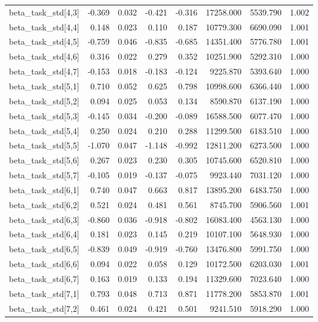 \begin{tabular}{lrrrrrrr}
beta\_task\_std[4,3] & -0.369 & 0.032 & -0.421 & -0.316 & 17258.000 & 5539.790 & 1.002 \\
beta\_task\_std[4,4] & 0.148 & 0.023 & 0.110 & 0.187 & 10779.300 & 6690.090 & 1.001 \\
beta\_task\_std[4,5] & -0.759 & 0.046 & -0.835 & -0.685 & 14351.400 & 5776.780 & 1.001 \\
beta\_task\_std[4,6] & 0.316 & 0.022 & 0.279 & 0.352 & 10251.900 & 5292.310 & 1.000 \\
beta\_task\_std[4,7] & -0.153 & 0.018 & -0.183 & -0.124 & 9225.870 & 5393.640 & 1.000 \\
beta\_task\_std[5,1] & 0.710 & 0.052 & 0.625 & 0.798 & 10998.600 & 6366.440 & 1.000 \\
beta\_task\_std[5,2] & 0.094 & 0.025 & 0.053 & 0.134 & 8590.870 & 6137.190 & 1.000 \\
beta\_task\_std[5,3] & -0.145 & 0.034 & -0.200 & -0.089 & 16588.500 & 6077.470 & 1.000 \\
beta\_task\_std[5,4] & 0.250 & 0.024 & 0.210 & 0.288 & 11299.500 & 6183.510 & 1.000 \\
beta\_task\_std[5,5] & -1.070 & 0.047 & -1.148 & -0.992 & 12811.200 & 6273.500 & 1.000 \\
beta\_task\_std[5,6] & 0.267 & 0.023 & 0.230 & 0.305 & 10745.600 & 6520.810 & 1.000 \\
beta\_task\_std[5,7] & -0.105 & 0.019 & -0.137 & -0.075 & 9923.440 & 7031.120 & 1.000 \\
beta\_task\_std[6,1] & 0.740 & 0.047 & 0.663 & 0.817 & 13895.200 & 6483.750 & 1.000 \\
beta\_task\_std[6,2] & 0.521 & 0.024 & 0.481 & 0.561 & 8745.700 & 5906.560 & 1.001 \\
beta\_task\_std[6,3] & -0.860 & 0.036 & -0.918 & -0.802 & 16083.400 & 4563.130 & 1.000 \\
beta\_task\_std[6,4] & 0.181 & 0.023 & 0.145 & 0.219 & 10107.100 & 5648.930 & 1.000 \\
beta\_task\_std[6,5] & -0.839 & 0.049 & -0.919 & -0.760 & 13476.800 & 5991.750 & 1.000 \\
beta\_task\_std[6,6] & 0.094 & 0.022 & 0.058 & 0.129 & 10172.500 & 6203.030 & 1.001 \\
beta\_task\_std[6,7] & 0.163 & 0.019 & 0.133 & 0.194 & 11329.600 & 7023.640 & 1.000 \\
beta\_task\_std[7,1] & 0.793 & 0.048 & 0.713 & 0.871 & 11778.200 & 5853.870 & 1.001 \\
beta\_task\_std[7,2] & 0.461 & 0.024 & 0.421 & 0.501 & 9241.510 & 5918.290 & 1.000 \\

\end{tabular}
